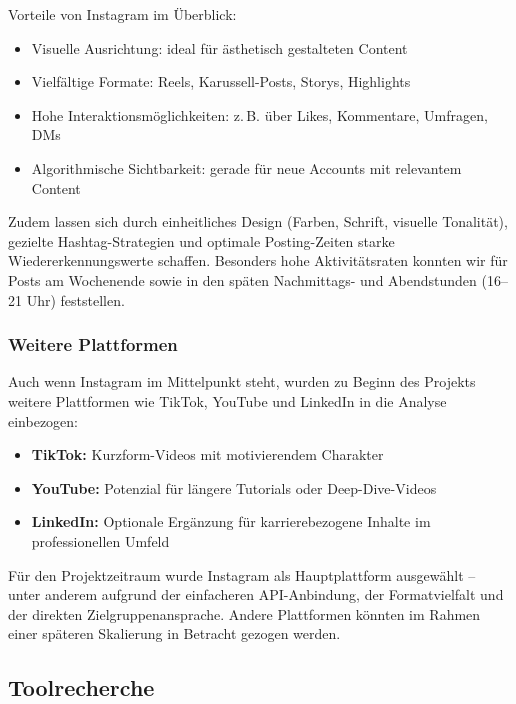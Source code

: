 \documentclass[a4paper,12pt]{article}
\begin{document}
Vorteile von Instagram im Überblick:

\begin{itemize}
    \item Visuelle Ausrichtung: ideal für ästhetisch gestalteten Content
    \item Vielfältige Formate: Reels, Karussell-Posts, Storys, Highlights
    \item Hohe Interaktionsmöglichkeiten: z.\,B. über Likes, Kommentare, Umfragen, DMs
    \item Algorithmische Sichtbarkeit: gerade für neue Accounts mit relevantem Content
\end{itemize}

Zudem lassen sich durch einheitliches Design (Farben, Schrift, visuelle Tonalität), gezielte Hashtag-Strategien und optimale Posting-Zeiten starke Wiedererkennungswerte schaffen. Besonders hohe Aktivitätsraten konnten wir für Posts am Wochenende sowie in den späten Nachmittags- und Abendstunden (16–21 Uhr) feststellen.

\subsubsection*{Weitere Plattformen}

Auch wenn Instagram im Mittelpunkt steht, wurden zu Beginn des Projekts weitere Plattformen wie TikTok, YouTube und LinkedIn in die Analyse einbezogen:

\begin{itemize}
    \item \textbf{TikTok:} Kurzform-Videos mit motivierendem Charakter
    \item \textbf{YouTube:} Potenzial für längere Tutorials oder Deep-Dive-Videos
    \item \textbf{LinkedIn:} Optionale Ergänzung für karrierebezogene Inhalte im professionellen Umfeld
\end{itemize}

Für den Projektzeitraum wurde Instagram als Hauptplattform ausgewählt – unter anderem aufgrund der einfacheren API-Anbindung, der Formatvielfalt und der direkten Zielgruppenansprache. Andere Plattformen könnten im Rahmen einer späteren Skalierung in Betracht gezogen werden.


\subsection{Toolrecherche}
\end{document}
